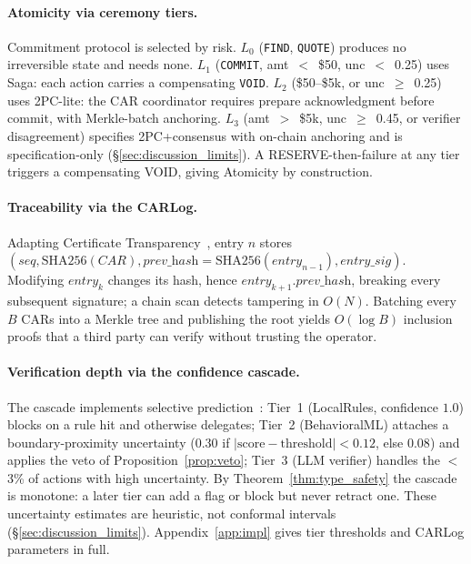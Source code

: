 \documentclass{article}
\begin{document}
\paragraph{Atomicity via ceremony tiers.} Commitment protocol is selected by risk.
$L_0$ (\texttt{FIND}, \texttt{QUOTE}) produces no irreversible state and needs none.
$L_1$ (\texttt{COMMIT}, amt~$<$~\$50, unc~$<$~0.25) uses Saga: each action carries a
compensating \texttt{VOID}. $L_2$ (\$50--\$5k, or unc~$\ge$~0.25) uses 2PC-lite: the CAR
coordinator requires prepare acknowledgment before commit, with Merkle-batch anchoring.
$L_3$ (amt~$>$~\$5k, unc~$\ge$~0.45, or verifier disagreement) specifies 2PC+consensus with
on-chain anchoring and is specification-only (\S\ref{sec:discussion_limits}). A
RESERVE-then-failure at any tier triggers a compensating VOID, giving Atomicity by construction.

\paragraph{Traceability via the CARLog.} Adapting Certificate Transparency~\cite{ct}, entry
$n$ stores $(\textit{seq}, \text{SHA256}(\textit{CAR}), \textit{prev\_hash}=\text{SHA256}(\textit{entry}_{n-1}), \textit{entry\_sig})$.
Modifying $\textit{entry}_k$ changes its hash, hence $\textit{entry}_{k+1}.\textit{prev\_hash}$,
breaking every subsequent signature; a chain scan detects tampering in $O(N)$. Batching every
$B$ CARs into a Merkle tree and publishing the root yields $O(\log B)$ inclusion proofs that a
third party can verify without trusting the operator.

\paragraph{Verification depth via the confidence cascade.}
\label{sec:cascade}
The cascade implements selective prediction~\cite{selective}: Tier~1 (LocalRules, confidence
$1.0$) blocks on a rule hit and otherwise delegates; Tier~2 (BehavioralML) attaches a
boundary-proximity uncertainty ($0.30$ if $|\text{score}-\text{threshold}|<0.12$, else $0.08$)
and applies the veto of Proposition~\ref{prop:veto}; Tier~3 (LLM verifier) handles the
$<$3\% of actions with high uncertainty. By Theorem~\ref{thm:type_safety} the cascade is
monotone: a later tier can add a flag or block but never retract one. These uncertainty
estimates are heuristic, not conformal intervals~\cite{conformal}
(\S\ref{sec:discussion_limits}). Appendix~\ref{app:impl} gives tier thresholds and CARLog
parameters in full.
\end{document}
